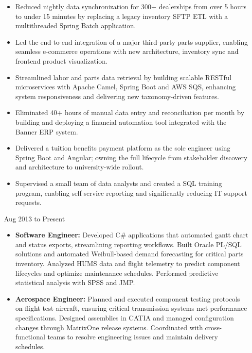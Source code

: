 \begin{itemize}[leftmargin=*]
    \item Reduced nightly data synchronization for 300+ dealerships from over 5 hours to under 15 minutes by replacing a
    legacy inventory SFTP ETL with a multithreaded Spring Batch application.
    \item
    Led the end-to-end integration of a major third-party parts supplier, enabling seamless e-commerce operations with
    new architecture, inventory sync and frontend product visualization.
    \item
    Streamlined labor and parts data retrieval by building scalable RESTful microservices with Apache Camel, Spring
    Boot and AWS SQS, enhancing system responsiveness and delivering new taxonomy-driven features.
\end{itemize}
\vspace{\jobGroupBottomMargin}

\begin{itemize}[leftmargin=*]
    \item Eliminated 40+ hours of manual data entry and reconciliation per month by building and deploying a financial
    automation tool integrated with the Banner ERP system.
    \item
    Delivered a tuition benefits payment platform as the sole engineer using Spring Boot and Angular; owning the full
    lifecycle from stakeholder discovery and architecture to university-wide rollout.
    \item
    Supervised a small team of data analysts and created a SQL training program, enabling self-service reporting and
    significantly reducing IT support requests.
\end{itemize}
\vspace{\jobGroupBottomMargin}

{Aug 2013 to Present}
\begin{itemize}[leftmargin=*]
    \item \textbf{Software Engineer:} Developed C\#
    applications that automated gantt chart and status exports, streamlining reporting workflows.
    Built Oracle PL/SQL solutions and automated Weibull-based demand forecasting for critical parts inventory.
    Analyzed HUMS data and flight telemetry to predict component lifecycles and optimize maintenance schedules.
    Performed predictive statistical analysis with SPSS and JMP.
    \item \textbf{Aerospace Engineer:}
    Planned and executed component testing protocols on flight test aircraft, ensuring critical transmission systems met
    performance specifications. Designed assemblies in CATIA and managed configuration changes through MatrixOne release
    systems. Coordinated with cross-functional teams to resolve engineering issues and maintain delivery schedules.

\end{itemize}



